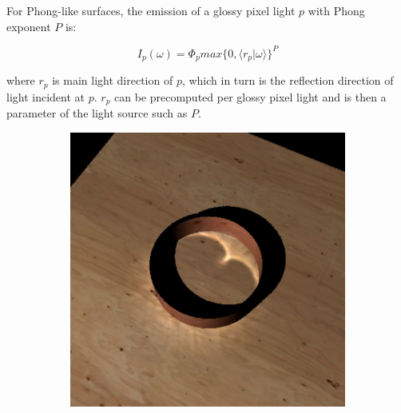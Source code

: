 For Phong-like surfaces, the emission of a glossy pixel light $p$ with Phong exponent $P$ is:

\begin{equation}\label{e:non-diffuse-radiant-intensity}
	I_p(\omega)=\Phi_p max\{ 0,\langle r_p|\omega\rangle \}^{P}
\end{equation}

where $r_p$ is main light direction of $p$, which in turn is the reflection direction of light incident at $p$. $r_p$ can be precomputed per glossy pixel light and is then a parameter of the light source such as $P$.

\begin{figure}\label{f:non-diffuse-surfaces}
\begin{center}
	\begin{subfigure}[b]{.48\textwidth}
		\includegraphics[width=1.\textwidth]{graphics/ir/ir-3-4}
	\end{subfigure}
	\begin{subfigure}[b]{.48\textwidth}

\end{subfigure}
\end{center}
\end{figure}

